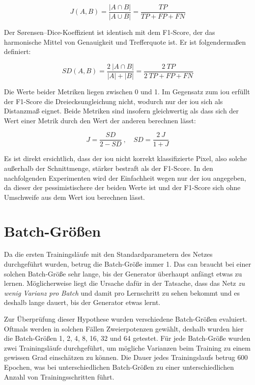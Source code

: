 \begin{equation}
J(A, B) = \frac{| A \cap B |}{| A \cup B |} = \frac{TP}{TP + FP + FN}
\end{equation}

Der Sørensen–Dice-Koeffizient ist identisch mit dem F1-Score, der das harmonische Mittel von Genauigkeit und Trefferquote ist.
Er ist folgendermaßen definiert:

\begin{equation}
SD(A, B) = \frac{2 \ | A \cap B |}{| A | + | B |} = \frac{2 \ TP}{2 \ TP + FP + FN}
\end{equation}

Die Werte beider Metriken liegen zwischen 0 und 1.
Im Gegensatz zum \gls{iou} erfüllt der F1-Score die Dreiecksungleichung nicht, wodurch nur der \gls{iou} sich als Distanzmaß eignet.
Beide Metriken sind insofern gleichwertig als dass sich der Wert einer Metrik durch den Wert der anderen berechnen lässt:

\begin{equation}
J = \frac{SD}{2 - SD} \ , \quad SD = \frac{2 \ J}{1 + J}
\end{equation}

Es ist direkt ersichtlich, dass der \gls{iou} nicht korrekt klassifizierte Pixel, also solche außerhalb der Schnittmenge, stärker bestraft als der F1-Score.
In den nachfolgenden Experimenten wird der Einfachheit wegen nur der \gls{iou} angegeben, da dieser der pessimistischere der beiden Werte ist und der F1-Score sich ohne Umschweife aus dem Wert \gls{iou} berechnen lässt.



\section{Batch-Größen}\label{sec:batchsize}

Da die ersten Trainingsläufe mit den Standardparametern des Netzes durchgeführt wurden, betrug die Batch-Größe immer 1.
Das \gls{can} braucht bei einer solchen Batch-Größe sehr lange, bis der Generator überhaupt anfängt etwas zu lernen.
Möglicherweise liegt die Ursache dafür in der Tatsache, dass das Netz \emph{zu wenig Varianz pro Batch} und damit pro Lernschritt zu sehen bekommt und es deshalb lange dauert, bis der Generator etwas lernt.

Zur Überprüfung dieser Hypothese wurden verschiedene Batch-Größen evaluiert.
Oftmals werden in solchen Fällen Zweierpotenzen gewählt, deshalb wurden hier die Batch-Größen 1, 2, 4, 8, 16, 32 und 64 getestet.
Für jede Batch-Größe wurden zwei Trainingsläufe durchgeführt, um mögliche Varianzen beim Training zu einem gewissen Grad einschätzen zu können.
Die Dauer jedes Trainingslaufs betrug 600 Epochen, was bei unterschiedlichen Batch-Größen zu einer unterschiedlichen Anzahl von Trainingsschritten führt.

